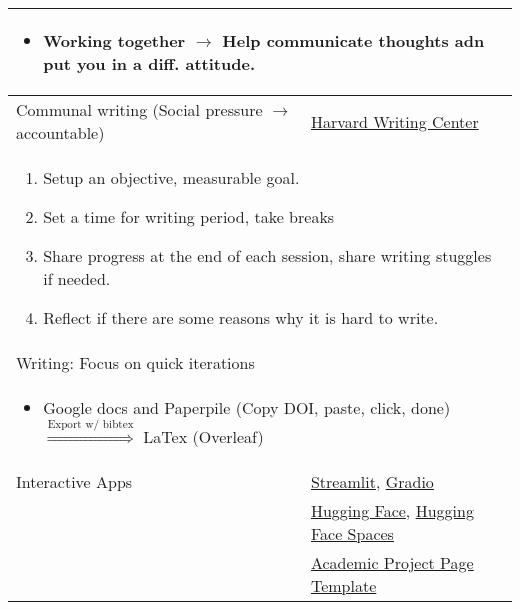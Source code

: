 \begin{summary}
\begin{center}
\begin{tabular}{ll}
            \multicolumn{2}{p{\linewidth}}{
            \begin{itemize}
                \item Working together $\rightarrow$ Help communicate thoughts adn put you in a diff. attitude.
            \end{itemize}}\\
            \midrule
            Communal writing (Social pressure $\rightarrow$ accountable) & \href{https://gsas.harvard.edu/academics/writing}{Harvard Writing Center} \\
            \multicolumn{2}{p{\linewidth}}{
            \begin{enumerate}
                \item Setup an objective, measurable goal. 
                \item Set a time for writing period, take breaks
                \item Share progress at the end of each session, share writing stuggles if needed.
                \item Reflect if there are some reasons why it is hard to write.
            \end{enumerate}}\\
            \midrule
            Writing: Focus on quick iterations & \\
            \multicolumn{2}{p{\linewidth}}{
            \begin{itemize}
                \item Google docs and Paperpile (Copy DOI, paste, click, done) $\overset{\text{Export w/ bibtex}}{\Longrightarrow}$ LaTex (Overleaf)
            \end{itemize}}\\
            \midrule
            Interactive Apps & \href{https://streamlit.io/}{Streamlit}, \href{https://www.gradio.app/}{Gradio} \\
            & \href{https://www.huggingface.co}{Hugging Face}, \href{https://www.hf.co/spaces}{Hugging Face Spaces} \\
            & \href{https://github.com/eliahuhorwitz/Academic-project-page-template}{Academic Project Page Template} \\
            \bottomrule
        \end{tabular}
    \end{center}
\end{summary}


